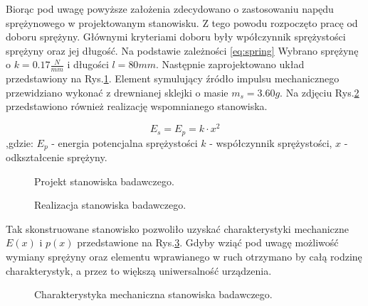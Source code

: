 \indent %
Biorąc pod uwagę powyższe założenia zdecydowano o zastosowaniu napędu sprężynowego w projektowanym stanowisku. Z tego powodu rozpoczęto pracę od doboru sprężyny. Głównymi kryteriami doboru były wpółczynnik sprężystości sprężyny oraz jej długość. Na podstawie zależności \ref{eq:spring} Wybrano sprężynę o $k=0.17\frac{N}{mm}$ i długości $l=80mm$. Następnie zaprojektowano
układ przedstawiony na Rys.\ref{fig:test_stand}. Element symulujący źródło impulsu mechanicznego przewidziano wykonać z drewnianej sklejki o masie $m_s = 3.60g$. Na zdjęciu Rys.\ref{fig:test_stand_photo} przedstawiono również realizację wspomnianego stanowiska.

\begin{equation}
E_s = E_p = k \cdot x^2
\label{eq:spring}
\end{equation}
,gdzie: $E_p$ - energia potencjalna sprężystości $k$ - współczynnik sprężystości, $x$ - odkształcenie sprężyny.


\begin{figure}[htbp]
\centering
{}%
\caption{Projekt stanowiska badawczego.}
\label{fig:test_stand}
\end{figure}

\begin{figure}[htbp]
\centering
{}
\caption{Realizacja stanowiska badawczego.}
\label{fig:test_stand_photo}
\end{figure}

Tak skonstruowane stanowisko pozwoliło uzyskać charakterystyki mechaniczne $E(x)$ i $p(x)$ przedstawione na Rys.\ref{fig:mech_char}. Gdyby wziąć pod uwagę możliwość wymiany sprężyny oraz elementu wprawianego w ruch otrzymano by całą rodzinę charakterystyk, a przez to większą uniwersalność urządzenia.

\begin{figure}[htbp]
\centering
{}%
\caption{Charakterystyka mechaniczna stanowiska badawczego.}
\label{fig:mech_char}
\end{figure}

